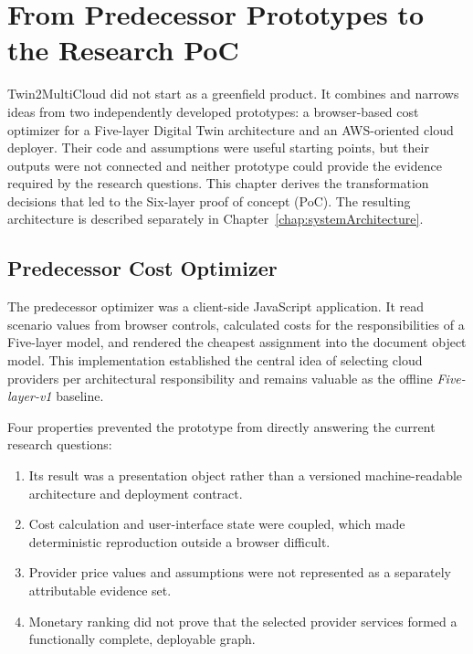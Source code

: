 \chapter{From Predecessor Prototypes to the Research PoC}
\label{chap:legacyAnalysis}

Twin2MultiCloud did not start as a greenfield product. It combines and narrows
ideas from two independently developed prototypes: a browser-based cost
optimizer for a Five-layer Digital Twin architecture and an AWS-oriented cloud
deployer. Their code and assumptions were useful starting points, but their
outputs were not connected and neither prototype could provide the evidence
required by the research questions. This chapter derives the transformation
decisions that led to the Six-layer proof of concept (PoC). The resulting
architecture is described separately in Chapter~\ref{chap:systemArchitecture}.

\section{Predecessor Cost Optimizer}
\label{sec:legacy-optimizer}

The predecessor optimizer was a client-side JavaScript application. It read
scenario values from browser controls, calculated costs for the responsibilities
of a Five-layer model, and rendered the cheapest assignment into the document
object model. This implementation established the central idea of selecting
cloud providers per architectural responsibility and remains valuable as the
offline \emph{Five-layer-v1} baseline.

Four properties prevented the prototype from directly answering the current
research questions:

\begin{enumerate}
    \item Its result was a presentation object rather than a versioned
    machine-readable architecture and deployment contract.
    \item Cost calculation and user-interface state were coupled, which made
    deterministic reproduction outside a browser difficult.
    \item Provider price values and assumptions were not represented as a
    separately attributable evidence set.
    \item Monetary ranking did not prove that the selected provider services
    formed a functionally complete, deployable graph.
\end{enumerate}

